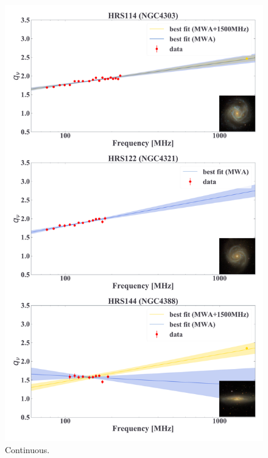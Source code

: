 \documentclass[12pt,a4paper,twoside,openright,final,titlepage]{report}
\begin{document}
\begin{appendices}
\begin{figure}[htbp]
    \centering
    \includegraphics[width=.8\linewidth]{Figures/AppendixC_qfitting3.pdf}
    \caption[Fitting results for 18 samples (3)]{\label{fig:fittingresults3}
        Continuous.
    }
\end{figure}


\end{appendices}
\end{document}
